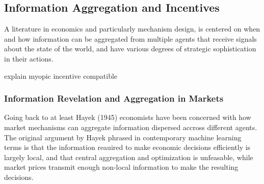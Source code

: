 \subsection{Information Aggregation and Incentives}

A literature in economics and particularly mechanism design, is centered on when and how information can be aggregated from multiple agents that receive signals about the state of the world, and have various degrees of strategic sophistication in their actions.

explain myopic incentive compatible

\subsubsection{Information Revelation and Aggregation in Markets}



Going back to at least Hayek (1945) economists have been concerned with how market mechanisms can aggregate information dispersed accross different agents.
The original argument by Hayek phrased in contemporary machine learning terms is that the information reauired to make economic decisions efficiently is largely local, and that central aggregation and optimization is unfeasable, while market prices transmit enough non-local information to make the resulting decisions.





